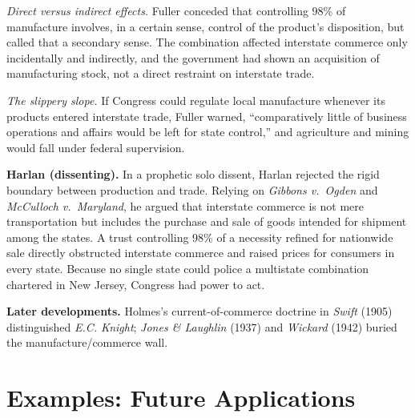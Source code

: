 \documentclass[12pt]{article}
\begin{document}
\emph{Direct versus indirect effects.} Fuller conceded that controlling 98\% of manufacture involves, in a certain sense, control of the product's disposition, but called that a secondary sense. The combination affected interstate commerce only incidentally and indirectly, and the government had shown an acquisition of manufacturing stock, not a direct restraint on interstate trade.

\emph{The slippery slope.} If Congress could regulate local manufacture whenever its products entered interstate trade, Fuller warned, ``comparatively little of business operations and affairs would be left for state control,'' and agriculture and mining would fall under federal supervision.

\textbf{Harlan (dissenting).} In a prophetic solo dissent, Harlan rejected the rigid boundary between production and trade. Relying on \textit{Gibbons v.\ Ogden} and \textit{McCulloch v.\ Maryland}, he argued that interstate commerce is not mere transportation but includes the purchase and sale of goods intended for shipment among the states. A trust controlling 98\% of a necessity refined for nationwide sale directly obstructed interstate commerce and raised prices for consumers in every state. Because no single state could police a multistate combination chartered in New Jersey, Congress had power to act.

\textbf{Later developments.} Holmes's current-of-commerce doctrine in \textit{Swift} (1905) distinguished \textit{E.C. Knight}; \textit{Jones \& Laughlin} (1937) and \textit{Wickard} (1942) buried the manufacture/commerce wall.

\section{Examples: Future Applications}
\end{document}
